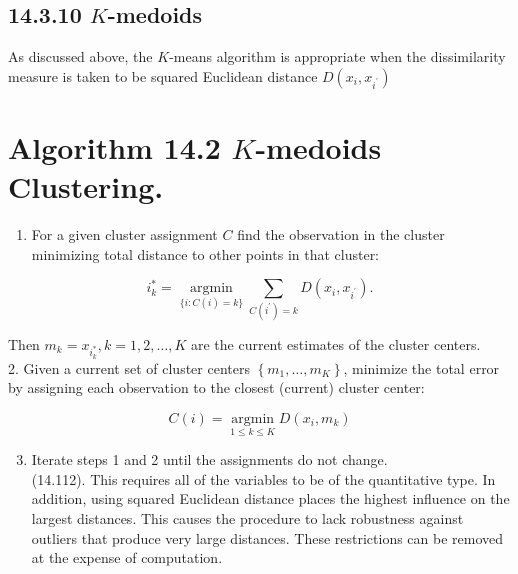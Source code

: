 \documentclass[10pt]{article}
\begin{document}
\subsection*{14.3.10 $K$-medoids}
As discussed above, the $K$-means algorithm is appropriate when the dissimilarity measure is taken to be squared Euclidean distance $D\left(x_{i}, x_{i^{\prime}}\right)$

\section*{Algorithm 14.2 $K$-medoids Clustering.}
\begin{enumerate}
  \item For a given cluster assignment $C$ find the observation in the cluster minimizing total distance to other points in that cluster:
\end{enumerate}


\begin{equation*}
i_{k}^{*}=\underset{\{i: C(i)=k\}}{\operatorname{argmin}} \sum_{C\left(i^{\prime}\right)=k} D\left(x_{i}, x_{i^{\prime}}\right) . \tag{14.35}
\end{equation*}


Then $m_{k}=x_{i_{k}^{*}}, k=1,2, \ldots, K$ are the current estimates of the cluster centers.\\
2. Given a current set of cluster centers $\left\{m_{1}, \ldots, m_{K}\right\}$, minimize the total error by assigning each observation to the closest (current) cluster center:


\begin{equation*}
C(i)=\underset{1 \leq k \leq K}{\operatorname{argmin}} D\left(x_{i}, m_{k}\right) \tag{14.36}
\end{equation*}


\begin{enumerate}
  \setcounter{enumi}{2}
  \item Iterate steps 1 and 2 until the assignments do not change.\\
(14.112). This requires all of the variables to be of the quantitative type. In addition, using squared Euclidean distance places the highest influence on the largest distances. This causes the procedure to lack robustness against outliers that produce very large distances. These restrictions can be removed at the expense of computation.
\end{enumerate}
\end{document}
